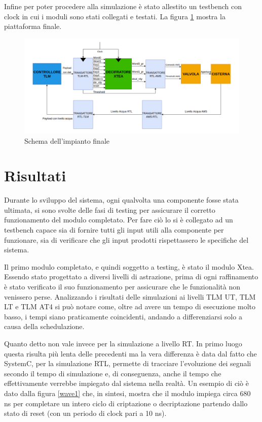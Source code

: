 \documentclass[]{IEEEtran}
\begin{document}
Infine per poter procedere alla simulazione è stato allestito un testbench con clock in cui i moduli sono stati collegati e testati. La figura \ref{scheme10} mostra la piattaforma finale.
\begin{figure}[htb]
	\centering
	\includegraphics[width=\textwidth]{Images/scheme10.png}
	\caption{Schema dell'impianto finale}
	\label{scheme10}
\end{figure}

\section{Risultati}
Durante lo sviluppo del sistema, ogni qualvolta una componente fosse stata ultimata, si sono svolte delle fasi di testing per assicurare il corretto funzionamento del modulo completato. Per fare ciò lo si è collegato ad un testbench capace sia di fornire tutti gli input utili alla componente per funzionare, sia di verificare che gli input prodotti rispettassero le specifiche del sistema.

Il primo modulo completato, e quindi soggetto a testing, è stato il modulo Xtea. Essendo stato progettato a diversi livelli di astrazione, prima di ogni raffinamento è stato verificato il suo funzionamento per assicurare che le funzionalità non venissero perse. Analizzando i risultati delle simulazioni ai livelli TLM UT, TLM LT e TLM AT4 si può notare come, oltre ad avere un tempo di esecuzione molto basso, i tempi siano praticamente coincidenti, andando a differenziarsi solo a causa della schedulazione.

 Quanto detto non vale invece per la simulazione a livello RT. In primo luogo questa risulta più lenta delle precedenti ma la vera differenza è data dal fatto che SystemC, per la simulazione RTL, permette di tracciare l'evoluzione dei segnali secondo il tempo di simulazione e, di conseguenza, anche il tempo che effettivamente verrebbe impiegato dal sistema nella realtà. Un esempio di ciò è dato dalla figura \ref{wave1} che, in sintesi, mostra che il modulo impiega circa 680 ns per completare un intero ciclo di criptazione o decriptazione partendo dallo stato di reset (con un periodo di clock pari a 10 ns).
\end{document}
